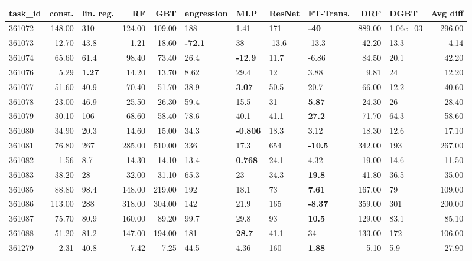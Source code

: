 \begin{table}[ht!]
\centering
\begingroup\footnotesize
\begin{tabular}{lrlrrllllrlr}
  \hline
\hline
task\_id & const. & lin. reg. & RF & GBT & engression & MLP & ResNet & FT-Trans. & DRF & DGBT & Avg diff \\ 
  \hline
361072 & 148.00 & 310 & 124.00 & 109.00 & 188 & 1.41 & 171 & \textbf{-40} & 889.00 & 1.06e+03 & 296.00 \\ 
  361073 & -12.70 & 43.8 & -1.21 & 18.60 & \textbf{-72.1} & 38 & -13.6 & -13.3 & -42.20 & 13.3 & -4.14 \\ 
  361074 & 65.60 & 61.4 & 98.40 & 73.40 & 26.4 & \textbf{-12.9} & 11.7 & -6.86 & 84.50 & 20.1 & 42.20 \\ 
  361076 & 5.29 & \textbf{1.27} & 14.20 & 13.70 & 8.62 & 29.4 & 12 & 3.88 & 9.81 & 24 & 12.20 \\ 
  361077 & 51.60 & 40.9 & 70.40 & 51.70 & 38.9 & \textbf{3.07} & 50.5 & 20.7 & 66.00 & 12.2 & 40.60 \\ 
  361078 & 23.00 & 46.9 & 25.50 & 26.30 & 59.4 & 15.5 & 31 & \textbf{5.87} & 24.30 & 26 & 28.40 \\ 
  361079 & 30.10 & 106 & 68.60 & 58.40 & 78.6 & 40.1 & 41.1 & \textbf{27.2} & 71.70 & 64.3 & 58.60 \\ 
  361080 & 34.90 & 20.3 & 14.60 & 15.00 & 34.3 & \textbf{-0.806} & 18.3 & 3.12 & 18.30 & 12.6 & 17.10 \\ 
  361081 & 76.80 & 267 & 285.00 & 510.00 & 336 & 17.3 & 654 & \textbf{-10.5} & 342.00 & 193 & 267.00 \\ 
  361082 & 1.56 & 8.7 & 14.30 & 14.10 & 13.4 & \textbf{0.768} & 24.1 & 4.32 & 19.00 & 14.6 & 11.50 \\ 
  361083 & 38.20 & 28 & 32.00 & 31.10 & 65.3 & 23 & 34.3 & \textbf{19.8} & 41.80 & 36.5 & 35.00 \\ 
  361085 & 88.80 & 98.4 & 148.00 & 219.00 & 192 & 18.1 & 73 & \textbf{7.61} & 167.00 & 79 & 109.00 \\ 
  361086 & 113.00 & 288 & 318.00 & 304.00 & 142 & 21.9 & 165 & \textbf{-8.37} & 359.00 & 301 & 200.00 \\ 
  361087 & 75.70 & 80.9 & 160.00 & 89.20 & 99.7 & 29.8 & 93 & \textbf{10.5} & 129.00 & 83.1 & 85.10 \\ 
  361088 & 51.20 & 81.2 & 147.00 & 194.00 & 181 & \textbf{28.7} & 41.1 & 34 & 133.00 & 172 & 106.00 \\ 
  361279 & 2.31 & 40.8 & 7.42 & 7.25 & 44.5 & 4.36 & 160 & \textbf{1.88} & 5.10 & 5.9 & 27.90 \\ 

\end{tabular}
\end{table}
